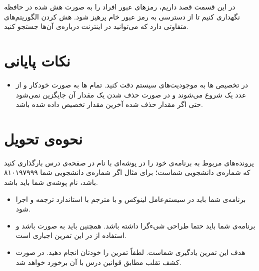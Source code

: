 \documentclass{utap}
\begin{document}
		در این قسمت قصد داریم، رمز‌های عبور افراد را به صورت هش شده در حافظه نگهداری کنیم تا از دسترسی به رمز عبور خام پرهیز شود. هش کردن الگوریتم‌های متفاوتی دارد که می‌توانید در اینترنت درباره‌ی آن‌ها جستجو کنید.

	\section{نکات پایانی}
		\begin{itemize}
			\item  در تخصیص  ها به موجودیت‌های سیستم دقت کنید. تمام  ها به صورت خودکار و از عدد یک شروع می‌شوند و در صورت حذف شدن یک  مقدار آن جایگزین نمی‌شود حتی اگر مقدار حذف شده آخرین مقدار تخصیص داده شده باشد.
		
		\end{itemize}

	\section{نحوه‌ی تحویل}
		پرونده‌‌های مربوط به برنامه‌ی خود را در پوشه‌ای با نام  در صفحه‌ی  درس بارگذاری کنید که  شماره‌ی دانشجویی شماست؛ برای مثال اگر شماره‌ی دانشجویی شما ۸۱۰۱۹۷۹۹۹ باشد، نام پوشه‌ی شما باید  باشد.
		\begin{itemize}
			\item
						برنامه‌ی شما باید در سیستم‌عامل لینوکس و با مترجم  با استاندارد  ترجمه و اجرا شود.
					\item
						برنامه‌ی شما باید حتما طراحی شیءگرا داشته باشد. همچنین باید به صورت  باشد و استفاده از  در این تمرین اجباری است.
					\item
						هدف این تمرین یادگیری شماست. لطفاً تمرین را خودتان انجام دهید. در صورت کشف تقلب مطابق قوانین درس با آن برخورد خواهد شد.
		\end{itemize}
\end{document}
